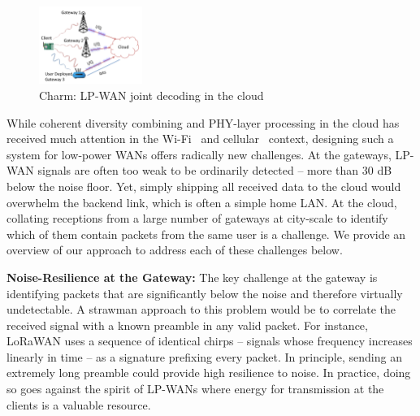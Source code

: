 \begin{figure}
    \centering
    \includegraphics[width=0.30\textwidth]{location-aware-network/figures/LoRaRAN.pdf}
        \vspace*{-0.1in}
    \caption{Charm: LP-WAN joint decoding in the cloud}
    \vspace*{-0.1in}
    \label{fig:my_label}
    \compactimg
\end{figure}




While coherent diversity combining and PHY-layer processing in the cloud has received much attention in the Wi-Fi~\cite{tan2009sam, xie2014scalable} and cellular~\cite{checko2015cloud, wubben2014benefits} context, designing such a system for low-power WANs offers radically new challenges. At the gateways,  LP-WAN signals are often too weak to be ordinarily detected -- more than 30 dB below the noise floor. Yet, simply shipping all received data to the cloud would overwhelm the backend link, which is often  a simple home LAN. At the cloud, collating receptions from a large number of gateways at city-scale to identify which of them contain packets from the same user is a challenge. We provide an overview of our approach to address each of these challenges below. 


\textbf{Noise-Resilience at the Gateway:} The key challenge at the gateway is identifying packets that are significantly below the noise and therefore virtually undetectable. A strawman approach to this problem would be to correlate the received signal with a known preamble in any valid packet. For instance, LoRaWAN uses a sequence of identical chirps -- signals whose frequency increases linearly in time -- as a signature prefixing every packet. In principle, sending an extremely long preamble could provide high resilience to noise. In practice, doing so goes against the spirit of LP-WANs where energy for transmission at the clients is a valuable resource. 

